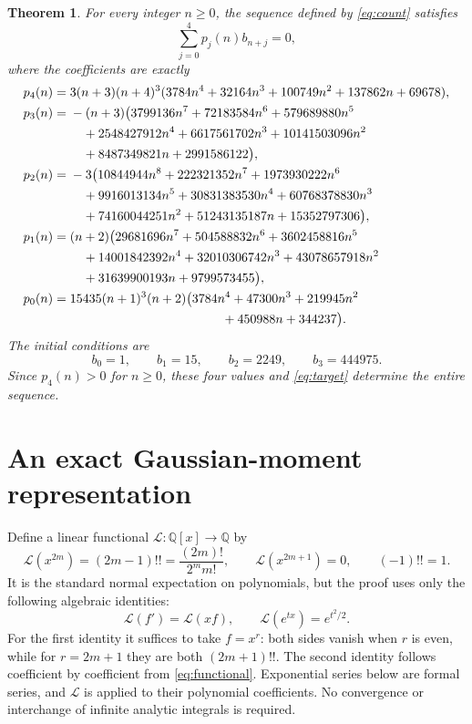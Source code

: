\documentclass[11pt]{article}
\newtheorem{theorem}{Theorem}
\newcommand{\Lfun}{\mathcal L}
\newcommand{\Q}{\mathbb Q}
\begin{document}
\newpage
\begin{theorem}\label{thm:main}
For every integer $n\geq0$, the sequence defined by \eqref{eq:count}
satisfies
\begin{equation}\label{eq:target}
 \sum_{j=0}^4 p_j(n)b_{n+j}=0,
\end{equation}
where the coefficients are exactly
\begin{align*}
 p_4(n)={}&3(n+3)(n+4)^3
 (3784n^4+32164n^3+100749n^2+137862n+69678),\\
 p_3(n)={}&-(n+3)\bigl(3799136n^7+72183584n^6+579689880n^5\\
 &\quad+2548427912n^4+6617561702n^3+10141503096n^2\\
 &\quad+8487349821n+2991586122\bigr),\\
 p_2(n)={}&-3\bigl(10844944n^8+222321352n^7+1973930222n^6\\
 &\quad+9916013134n^5+30831383530n^4+60768378830n^3\\
 &\quad+74160044251n^2+51243135187n+15352797306\bigr),\\
 p_1(n)={}&(n+2)\bigl(29681696n^7+504588832n^6+3602458816n^5\\
 &\quad+14001842392n^4+32010306742n^3+43078657918n^2\\
 &\quad+31639900193n+9799573455\bigr),\\
 p_0(n)={}&15435(n+1)^3(n+2)
 \bigl(3784n^4+47300n^3+219945n^2\\
 &\hspace{42mm}+450988n+344237\bigr).
\end{align*}
The initial conditions are
\begin{equation}\label{eq:initial}
 b_0=1,\qquad b_1=15,\qquad b_2=2249,\qquad b_3=444975.
\end{equation}
Since $p_4(n)>0$ for $n\geq0$, these four values and
\eqref{eq:target} determine the entire sequence.
\end{theorem}

\section{An exact Gaussian-moment representation}
Define a linear functional $\Lfun:\Q[x]\to\Q$ by
\begin{equation}\label{eq:functional}
 \Lfun(x^{2m})=(2m-1)!!=\frac{(2m)!}{2^m m!},\qquad
 \Lfun(x^{2m+1})=0,\qquad (-1)!!=1.
\end{equation}
It is the standard normal expectation on polynomials, but the proof
uses only the following algebraic identities:
\begin{equation}\label{eq:ibp}
 \Lfun(f')=\Lfun(xf),\qquad
 \Lfun(e^{tx})=e^{t^2/2}.
\end{equation}
For the first identity it suffices to take $f=x^r$: both sides vanish
when $r$ is even, while for $r=2m+1$ they are both $(2m+1)!!$.
The second identity follows coefficient by coefficient from
\eqref{eq:functional}. Exponential series below are formal series, and
$\Lfun$ is applied to their polynomial coefficients. No convergence or
interchange of infinite analytic integrals is required.
\end{document}
